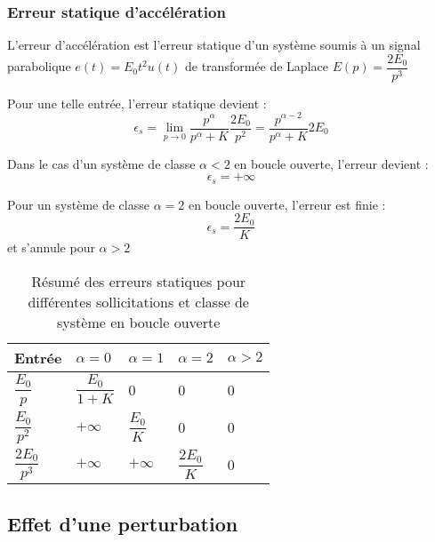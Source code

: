 \subsubsection{Erreur statique d'accélération}
L'erreur d'accélération est l'erreur statique d'un système soumis à un signal
parabolique $e(t)=E_0t^2 u(t)$ de transformée de Laplace 
$E(p)=\dfrac{2E_0}{p^3}$

Pour une telle entrée, l'erreur statique devient :
$$
\epsilon_s=\lim\limits_{p\to 0} \dfrac{p^\alpha}{p^\alpha+K}\dfrac{2E_0}{p^2}
          =\dfrac{p^{\alpha-2}}{p^\alpha+K}2E_0 
$$

Dans le cas d'un système de classe $\alpha<2$ en boucle ouverte, 
l'erreur devient :
$$
\epsilon_s=+\infty
$$

Pour un système de classe $\alpha=2$ en boucle ouverte, 
l'erreur est finie :
$$
\epsilon_s=\dfrac{2E_0}{K}
$$
et s'annule pour $\alpha>2$

\begin{table}
    \centering
    \begin{tabular}{@{}P{2cm}P{2cm}P{2cm}P{2cm}P{2cm}@{}}
    \toprule
    Entrée & $\alpha=0$ & $\alpha=1$ & $\alpha=2$ & $\alpha>2$ \\
    \midrule
    $\dfrac{E_0}{p}$&$\dfrac{E_0}{1+K}$&0&0&0\\
    $\dfrac{E_0}{p^2}$&$+\infty$&$\dfrac{E_0}{K}$&0&0\\
    $\dfrac{2E_0}{p^3}$&$+\infty$&$+\infty$&$\dfrac{2E_0}{K}$&0\\
    \bottomrule
    \end{tabular}
    \caption{Résumé des erreurs statiques pour différentes 
             sollicitations et classe de système en boucle ouverte}
\end{table}
\subsection{Effet d'une perturbation}
